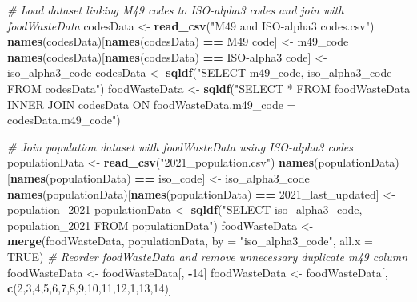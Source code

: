 \documentclass[
]{article}
\newenvironment{Shaded}{\begin{snugshade}}{\end{snugshade}}
\newcommand{\AttributeTok}[1]{\textcolor[rgb]{0.13,0.29,0.53}{#1}}
\newcommand{\CommentTok}[1]{\textcolor[rgb]{0.56,0.35,0.01}{\textit{#1}}}
\newcommand{\ConstantTok}[1]{\textcolor[rgb]{0.56,0.35,0.01}{#1}}
\newcommand{\DecValTok}[1]{\textcolor[rgb]{0.00,0.00,0.81}{#1}}
\newcommand{\FunctionTok}[1]{\textcolor[rgb]{0.13,0.29,0.53}{\textbf{#1}}}
\newcommand{\NormalTok}[1]{#1}
\newcommand{\OtherTok}[1]{\textcolor[rgb]{0.56,0.35,0.01}{#1}}
\newcommand{\SpecialCharTok}[1]{\textcolor[rgb]{0.81,0.36,0.00}{\textbf{#1}}}
\newcommand{\StringTok}[1]{\textcolor[rgb]{0.31,0.60,0.02}{#1}}
\begin{document}
\begin{Shaded}
\begin{Highlighting}[]
\CommentTok{\# Load dataset linking M49 codes to ISO{-}alpha3 codes and join with foodWasteData}
\NormalTok{codesData }\OtherTok{\textless{}{-}} \FunctionTok{read\_csv}\NormalTok{(}\StringTok{"M49 and ISO{-}alpha3 codes.csv"}\NormalTok{)}
\FunctionTok{names}\NormalTok{(codesData)[}\FunctionTok{names}\NormalTok{(codesData) }\SpecialCharTok{==} \StringTok{\textquotesingle{}M49 code\textquotesingle{}}\NormalTok{] }\OtherTok{\textless{}{-}} \StringTok{\textquotesingle{}m49\_code\textquotesingle{}}
\FunctionTok{names}\NormalTok{(codesData)[}\FunctionTok{names}\NormalTok{(codesData) }\SpecialCharTok{==} \StringTok{\textquotesingle{}ISO{-}alpha3 code\textquotesingle{}}\NormalTok{] }\OtherTok{\textless{}{-}} \StringTok{\textquotesingle{}iso\_alpha3\_code\textquotesingle{}}
\NormalTok{codesData }\OtherTok{\textless{}{-}} \FunctionTok{sqldf}\NormalTok{(}\StringTok{"SELECT m49\_code, iso\_alpha3\_code FROM codesData"}\NormalTok{)}
\NormalTok{foodWasteData }\OtherTok{\textless{}{-}} \FunctionTok{sqldf}\NormalTok{(}\StringTok{"SELECT * FROM foodWasteData INNER JOIN codesData }
\StringTok{                 ON foodWasteData.m49\_code = codesData.m49\_code"}\NormalTok{)}

\CommentTok{\# Join population dataset with foodWasteData using ISO{-}alpha3 codes}
\NormalTok{populationData }\OtherTok{\textless{}{-}} \FunctionTok{read\_csv}\NormalTok{(}\StringTok{"2021\_population.csv"}\NormalTok{)}
\FunctionTok{names}\NormalTok{(populationData)[}\FunctionTok{names}\NormalTok{(populationData) }\SpecialCharTok{==} \StringTok{\textquotesingle{}iso\_code\textquotesingle{}}\NormalTok{] }\OtherTok{\textless{}{-}} \StringTok{\textquotesingle{}iso\_alpha3\_code\textquotesingle{}}
\FunctionTok{names}\NormalTok{(populationData)[}\FunctionTok{names}\NormalTok{(populationData) }\SpecialCharTok{==} \StringTok{\textquotesingle{}2021\_last\_updated\textquotesingle{}}\NormalTok{] }\OtherTok{\textless{}{-}} \StringTok{\textquotesingle{}population\_2021\textquotesingle{}}
\NormalTok{populationData }\OtherTok{\textless{}{-}} \FunctionTok{sqldf}\NormalTok{(}\StringTok{"SELECT iso\_alpha3\_code, population\_2021 FROM populationData"}\NormalTok{)}
\NormalTok{foodWasteData }\OtherTok{\textless{}{-}} \FunctionTok{merge}\NormalTok{(foodWasteData, populationData, }\AttributeTok{by =} \StringTok{"iso\_alpha3\_code"}\NormalTok{, }\AttributeTok{all.x =} \ConstantTok{TRUE}\NormalTok{)}
\CommentTok{\# Reorder foodWasteData and remove unnecessary duplicate m49 column}
\NormalTok{foodWasteData }\OtherTok{\textless{}{-}}\NormalTok{ foodWasteData[, }\SpecialCharTok{{-}}\DecValTok{14}\NormalTok{]}
\NormalTok{foodWasteData }\OtherTok{\textless{}{-}}\NormalTok{ foodWasteData[, }\FunctionTok{c}\NormalTok{(}\DecValTok{2}\NormalTok{,}\DecValTok{3}\NormalTok{,}\DecValTok{4}\NormalTok{,}\DecValTok{5}\NormalTok{,}\DecValTok{6}\NormalTok{,}\DecValTok{7}\NormalTok{,}\DecValTok{8}\NormalTok{,}\DecValTok{9}\NormalTok{,}\DecValTok{10}\NormalTok{,}\DecValTok{11}\NormalTok{,}\DecValTok{12}\NormalTok{,}\DecValTok{1}\NormalTok{,}\DecValTok{13}\NormalTok{,}\DecValTok{14}\NormalTok{)]}
\end{Highlighting}
\end{Shaded}
\end{document}
